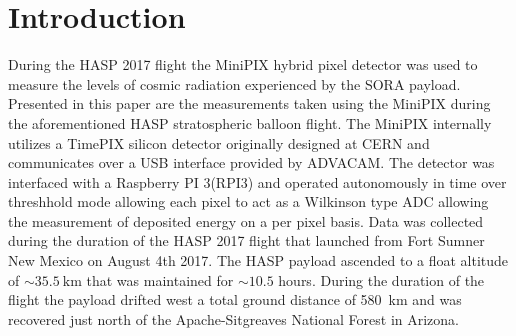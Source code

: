 \section{Introduction}
\label{Introduction}
During the HASP 2017\cite{hasp} flight the MiniPIX hybrid pixel detector\cite{minipix} was used to measure the levels of cosmic radiation experienced by the SORA payload\cite{sora}. Presented in this paper are the measurements taken using the MiniPIX during the aforementioned HASP stratospheric balloon flight. The MiniPIX internally utilizes a TimePIX silicon detector originally designed at CERN\cite{cern} and communicates over a USB interface provided by ADVACAM\cite{advacam}. The detector was interfaced with a Raspberry PI 3(RPI3) and operated autonomously in time over threshhold mode allowing each pixel to act as a Wilkinson type ADC allowing the measurement of deposited energy on a per pixel basis. Data was collected during the duration of the HASP 2017 flight that launched from Fort Sumner New Mexico on August 4th 2017. The HASP payload ascended to a float altitude of $\sim{}\SI{35.5}{\kilo\meter}$ that was maintained for $\sim{}10.5$ hours. During the duration of the flight the payload drifted west a total ground distance of \SI{580}{\kilo\meter} and was recovered just north of the Apache-Sitgreaves National Forest in Arizona.
